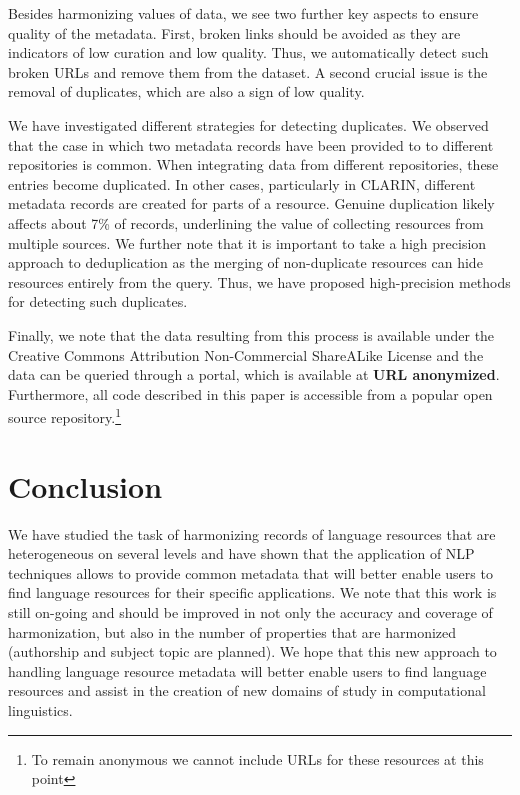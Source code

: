 \documentclass[11pt]{article}
\begin{document}
Besides harmonizing values of data, we see two further key aspects to ensure quality of the metadata.
First, broken links should be avoided as they are indicators of low curation and
low quality. Thus, we automatically detect such broken URLs and remove them from the dataset. A second crucial issue is the removal of duplicates, which are also a sign of low quality.

We have investigated different strategies for detecting duplicates. We observed
that the case in which two metadata records have been provided to to different
repositories is common. When integrating data from different repositories, these
entries become duplicated. In other cases, particularly in CLARIN, different
metadata records are created for parts of a resource. Genuine duplication likely
affects about 7\% of records, underlining the value of collecting resources from
multiple sources. We further note that it is important to take
a high precision approach to deduplication as the merging of non-duplicate
resources can hide resources entirely from the query. Thus, we have proposed 
high-precision methods for detecting such duplicates. 

Finally, we note that the data resulting from this process is available
under the Creative Commons Attribution Non-Commercial ShareALike License 
and the data can be queried through a portal, which is available at \textbf{URL anonymized}. Furthermore, all
code described in this paper is accessible from a popular open source
repository.\footnote{To remain anonymous we cannot include URLs for these
resources at this point}

\section{Conclusion}

We have studied the task of harmonizing records of language resources that are
heterogeneous on several levels and have shown that the application of NLP
techniques allows to provide common metadata that will better enable users to
find language resources for their specific applications. We note that this work
is still on-going and should be improved in not only the accuracy and coverage
of harmonization, but also in the number of properties that are harmonized
(authorship and subject topic are planned). We hope that this new
approach to handling language resource metadata will better enable users to find
language resources and assist in the creation of new domains of study in
computational linguistics.
\end{document}
